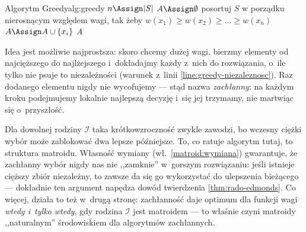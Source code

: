 \begin{alg}{Algorytm Greedy}{alg:greedy}
	\State $n \Assign |S|$
	\State $A \Assign \emptyset$ 
	\State posortuj $S$ w porządku nierosnącym względem wagi, tak żeby $w(x_1) \geq w(x_2) \geq \ldots \geq w(x_n)$
	 \label{line:greedy-niezaleznosc}
	\State $A \Assign A \cup \{x_i\}$
	\EndIf
	\EndFor
	\State \Return $A$
	\EndFunction
\end{alg}

\begin{dygresja}
	Idea jest możliwie najprostsza: skoro chcemy dużej wagi, bierzmy elementy od najcięższego do najlżejszego i~dokładajmy każdy z~nich do rozwiązania, o~ile tylko nie psuje to niezależności (warunek z~linii \ref{line:greedy-niezaleznosc}). Raz dodanego elementu nigdy nie wycofujemy --- stąd nazwa \emph{zachłanny}: na każdym kroku podejmujemy lokalnie najlepszą decyzję i~się jej trzymamy, nie martwiąc się o~przyszłość.

	Dla dowolnej rodziny $\mathcal{I}$ taka krótkowzroczność zwykle zawodzi, bo wczesny ciężki wybór może zablokować dwa lepsze późniejsze. To, co ratuje algorytm tutaj, to struktura matroidu. Własność wymiany (wł.\ \ref{matroid:wymiana}) gwarantuje, że zachłanny wybór nigdy nas nie ,,zamknie'' w~gorszym rozwiązaniu: jeśli istnieje cięższy zbiór niezależny, to zawsze da się go wykorzystać do ulepszenia bieżącego --- dokładnie ten argument napędza dowód twierdzenia \ref{thm:rado-edmonds}. Co więcej, działa to też w~drugą stronę: zachłanność daje optimum dla  funkcji wagi \emph{wtedy i~tylko wtedy}, gdy rodzina $\mathcal{I}$ jest matroidem --- to właśnie czyni matroidy ,,naturalnym'' środowiskiem dla algorytmów zachłannych.
\end{dygresja}

